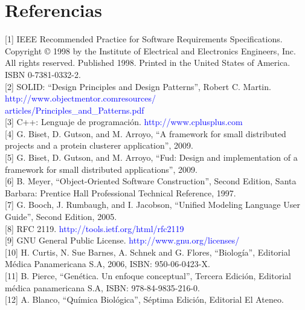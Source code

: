 \section{Referencias}
\label{appendix-ref}
[1] IEEE Recommended Practice for Software Requirements Specifications. Copyright © 1998 by the Institute of Electrical and Electronics Engineers, Inc. All rights reserved. Published 1998. Printed in the United States of America. ISBN 0-7381-0332-2. \\

[2] SOLID: ``Design Principles and Design Patterns'', Robert C. Martin. 
\textcolor{blue}{http://www.objectmentor.comresources/}\\
\textcolor{blue}{articles/Principles\_and\_Patterns.pdf} \\


[3] C++: Lenguaje de programación. \textcolor{blue}{http://www.cplusplus.com} \\

[4] G. Biset, D. Gutson, and M. Arroyo, “A framework for small distributed projects and a protein clusterer application”, 2009. \\

[5] G. Biset, D. Gutson, and M. Arroyo, “Fud: Design and implementation of a framework for small distributed applications”, 2009. \\

[6] B. Meyer, “Object-Oriented Software Construction”, Second Edition, Santa Barbara: Prentice Hall Professional Technical Reference, 1997. \\

[7] G. Booch, J. Rumbaugh, and I. Jacobson, “Unified Modeling Language User Guide”, Second Edition, 2005. \\

[8] RFC 2119. \textcolor{blue}{http://tools.ietf.org/html/rfc2119} \\

[9] GNU General Public License. \textcolor{blue}{http://www.gnu.org/licenses/} \\

[10] H. Curtis, N. Sue Barnes, A. Schnek and G. Flores, “Biología”, Editorial Médica Panamericana S.A, 2006, ISBN: 950-06-0423-X. \\

[11] B. Pierce, “Genética. Un enfoque conceptual”, Tercera Edición, Editorial médica panamericana S.A, ISBN: 978-84-9835-216-0. \\

[12] A. Blanco, “Química Biológica”, Séptima Edición, Editorial El Ateneo. \\

